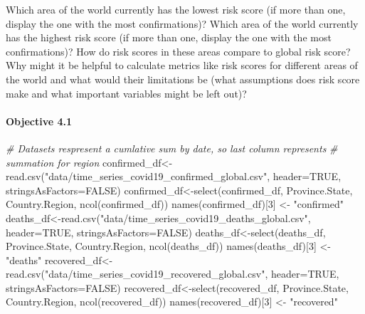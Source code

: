 \documentclass[
]{article}
\newenvironment{Shaded}{\begin{snugshade}}{\end{snugshade}}
\newcommand{\AttributeTok}[1]{\textcolor[rgb]{0.77,0.63,0.00}{#1}}
\newcommand{\CommentTok}[1]{\textcolor[rgb]{0.56,0.35,0.01}{\textit{#1}}}
\newcommand{\ConstantTok}[1]{\textcolor[rgb]{0.00,0.00,0.00}{#1}}
\newcommand{\DecValTok}[1]{\textcolor[rgb]{0.00,0.00,0.81}{#1}}
\newcommand{\FunctionTok}[1]{\textcolor[rgb]{0.00,0.00,0.00}{#1}}
\newcommand{\NormalTok}[1]{#1}
\newcommand{\OtherTok}[1]{\textcolor[rgb]{0.56,0.35,0.01}{#1}}
\newcommand{\StringTok}[1]{\textcolor[rgb]{0.31,0.60,0.02}{#1}}
\begin{document}
Which area of the world currently has the lowest risk score (if more
than one, display the one with the most confirmations)? Which area of
the world currently has the highest risk score (if more than one,
display the one with the most confirmations)? How do risk scores in
these areas compare to global risk score? Why might it be helpful to
calculate metrics like risk scores for different areas of the world and
what would their limitations be (what assumptions does risk score make
and what important variables might be left out)?

\hypertarget{objective-4.1}{%
\paragraph{Objective 4.1}\label{objective-4.1}}

\begin{Shaded}
\begin{Highlighting}[]
\CommentTok{\# Datasets respresent a cumlative sum by date, so last column represents }
\CommentTok{\# summation for region}
\NormalTok{confirmed\_df}\OtherTok{\textless{}{-}}\FunctionTok{read.csv}\NormalTok{(}\StringTok{"data/time\_series\_covid19\_confirmed\_global.csv"}\NormalTok{, }
                       \AttributeTok{header=}\ConstantTok{TRUE}\NormalTok{, }\AttributeTok{stringsAsFactors=}\ConstantTok{FALSE}\NormalTok{)}
\NormalTok{confirmed\_df}\OtherTok{\textless{}{-}}\FunctionTok{select}\NormalTok{(confirmed\_df, Province.State, }
\NormalTok{                     Country.Region, }\FunctionTok{ncol}\NormalTok{(confirmed\_df))}
\FunctionTok{names}\NormalTok{(confirmed\_df)[}\DecValTok{3}\NormalTok{] }\OtherTok{\textless{}{-}} \StringTok{"confirmed"}
\NormalTok{deaths\_df}\OtherTok{\textless{}{-}}\FunctionTok{read.csv}\NormalTok{(}\StringTok{"data/time\_series\_covid19\_deaths\_global.csv"}\NormalTok{, }
                    \AttributeTok{header=}\ConstantTok{TRUE}\NormalTok{, }\AttributeTok{stringsAsFactors=}\ConstantTok{FALSE}\NormalTok{)}
\NormalTok{deaths\_df}\OtherTok{\textless{}{-}}\FunctionTok{select}\NormalTok{(deaths\_df, Province.State, }
\NormalTok{                  Country.Region, }\FunctionTok{ncol}\NormalTok{(deaths\_df))}
\FunctionTok{names}\NormalTok{(deaths\_df)[}\DecValTok{3}\NormalTok{] }\OtherTok{\textless{}{-}} \StringTok{"deaths"}
\NormalTok{recovered\_df}\OtherTok{\textless{}{-}}\FunctionTok{read.csv}\NormalTok{(}\StringTok{"data/time\_series\_covid19\_recovered\_global.csv"}\NormalTok{, }
                       \AttributeTok{header=}\ConstantTok{TRUE}\NormalTok{, }\AttributeTok{stringsAsFactors=}\ConstantTok{FALSE}\NormalTok{)}
\NormalTok{recovered\_df}\OtherTok{\textless{}{-}}\FunctionTok{select}\NormalTok{(recovered\_df, Province.State, }
\NormalTok{                     Country.Region, }\FunctionTok{ncol}\NormalTok{(recovered\_df))}
\FunctionTok{names}\NormalTok{(recovered\_df)[}\DecValTok{3}\NormalTok{] }\OtherTok{\textless{}{-}} \StringTok{"recovered"}


\end{Highlighting}
\end{Shaded}
\end{document}

